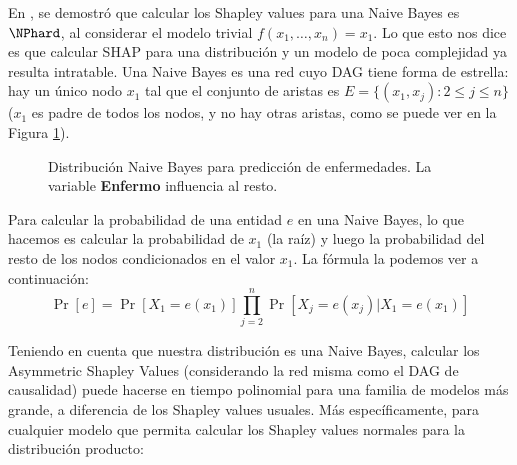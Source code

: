 En \cite{van2022tractability}, se demostró que calcular los Shapley values para una Naive Bayes es \(\NPhard\), al considerar el modelo trivial \(f(x_1,\ldots,x_n) = x_1\). Lo que esto nos dice es que calcular SHAP para una distribución y un modelo de poca complejidad ya resulta intratable. Una Naive Bayes es una red cuyo DAG tiene forma de estrella:  hay un único nodo \(x_1\) tal que el conjunto de aristas es \(E = \{(x_1, x_j) : 2 \leq j \leq n\}\) (\(x_1\) es padre de todos los nodos, y no hay otras aristas, como se puede ver en la Figura \ref{fig:naiveBayesExample}).  

\begin{figure}[ht]
	\centering
	\caption{Distribución Naive Bayes para predicción de enfermedades. La variable \textbf{Enfermo} influencia al resto.}
	\label{fig:naiveBayesExample}
\end{figure}


Para calcular la probabilidad de una entidad \(e\) en una Naive Bayes, lo que hacemos es calcular la probabilidad de $x_1$ (la raíz) y luego la probabilidad del resto de los nodos condicionados en el valor $x_1$. La fórmula la podemos ver a continuación:
\[
\Pr[e] = \Pr[X_1 = e(x_1)] \prod_{j=2}^n \Pr[X_j = e(x_j) | X_1 = e(x_1)]
\]

Teniendo en cuenta que nuestra distribución es una Naive Bayes, calcular los Asymmetric Shapley Values (considerando la red misma como el DAG de causalidad) puede hacerse en tiempo polinomial para una familia de modelos más grande, a diferencia de los Shapley values usuales. Más específicamente, para cualquier modelo que permita calcular los Shapley values normales para la distribución producto:


